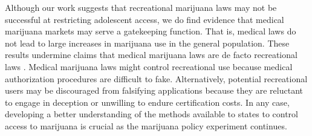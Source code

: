 \documentclass[12pt]{article}%
\begin{document}
Although our work suggests that recreational marijuana laws may not be successful at restricting adolescent access, we do find evidence that medical marijuana markets may serve a gatekeeping function. That is, medical laws do not lead to large increases in marijuana use in the general population. These results undermine claims that medical marijuana laws are de facto recreational laws \citep{Anderson2014}. Medical marijuana laws might control recreational use because medical authorization procedures are difficult to fake. Alternatively, potential recreational users may be discouraged from falsifying applications because they are reluctant to engage in deception or unwilling to endure certification costs. In any case, developing a better understanding of the methods available to states to control access to marijuana is crucial as the marijuana policy experiment continues.
  
\FloatBarrier
\newpage
\setlength{\bibsep}{0.0pt}
\begin{spacing}{0}

{}
\end{spacing}

\newpage

\FloatBarrier
\setcounter{page}{1}

\renewcommand*{\thepage}{A\arabic{page}}

\setcounter{table}{0}
\setcounter{figure}{0}


\renewcommand{\thetable}{A\arabic{table}}
\renewcommand{\thefigure}{A\arabic{figure}}
\renewcommand{\thesection}{A.\arabic{section}}
\renewcommand{\thesubsection}{A.\arabic{subsection}}

\FloatBarrier
\end{document}
